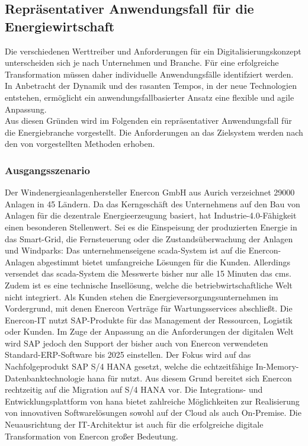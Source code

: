 \subsection{Repräsentativer Anwendungsfall für die Energiewirtschaft}\label{usecase}

Die verschiedenen Werttreiber und Anforderungen für ein Digitalisierungskonzept unterscheiden sich je nach Unternehmen und Branche.
Für eine erfolgreiche Transformation müssen daher individuelle Anwendungsfälle identifziert werden.
In Anbetracht der Dynamik und des rasanten Tempos, in der neue Technologien entstehen,
ermöglicht ein anwendungsfallbasierter Ansatz eine flexible und agile Anpassung. \citep[S. 31]{Acharya2019}
\\Aus diesen Gründen wird im Folgenden ein repräsentativer Anwendungsfall für die Energiebranche vorgestellt. Die Anforderungen an das Zielsystem werden nach den von \citet{Lauenroth2016} vorgestellten Methoden erhoben.

\subsubsection{Ausgangsszenario} \label{usecase}

Der Windenergieanlagenhersteller Enercon GmbH aus Aurich verzeichnet 29000 Anlagen in 45 Ländern. Da das Kerngeschäft des Unternehmens auf den Bau von Anlagen für die dezentrale Energieerzeugung basiert, hat Industrie-4.0-Fähigkeit einen besonderen Stellenwert. Sei es die Einspeisung der produzierten Energie in das Smart-Grid, die Fernsteuerung oder die Zustandsüberwachung der Anlagen und Windparks: Das unternehmenseigene \acf{scada}-System ist auf die Enercon-Anlagen abgestimmt bietet umfangreiche Lösungen für die Kunden. Allerdings versendet das \ac{scada}-System die Messwerte bisher nur alle 15 Minuten das \ac{cms}. Zudem ist es eine technische Insellösung, welche die betriebwirtschaftliche Welt nicht integriert. Als Kunden stehen die Energieversorgungsunternehmen im Vordergrund, mit denen Enercon Verträge für Wartungsservices abschließt. Die Enercon-IT nutzt SAP-Produkte für das Management der Ressourcen, Logistik oder Kunden. Im Zuge der Anpassung an die Anforderungen der digitalen Welt wird SAP jedoch den Support der bisher auch von Enercon verwendeten Standard-ERP-Software bis 2025 einstellen. Der Fokus wird auf das Nachfolgeprodukt SAP S/4 HANA gesetzt, welche die echtzeitfähige In-Memory-Datenbanktechnologie \acf{hana} für nutzt. Aus diesem Grund bereitet sich Enercon rechtzeitig auf die Migration auf S/4 HANA vor. Die Integrations- und Entwicklungsplattform von \ac{hana} bietet zahlreiche Möglichkeiten zur Realisierung von innovativen Softwarelösungen sowohl auf der Cloud als auch On-Premise. Die Neuausrichtung der IT-Architektur ist auch für die erfolgreiche digitale Transformation von Enercon großer Bedeutung.

